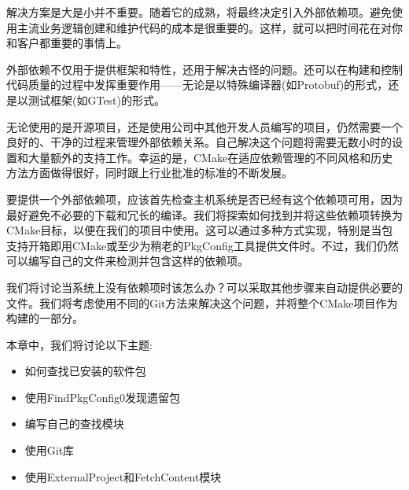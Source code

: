 解决方案是大是小并不重要。随着它的成熟，将最终决定引入外部依赖项。避免使用主流业务逻辑创建和维护代码的成本是很重要的。这样，就可以把时间花在对你和客户都重要的事情上。

外部依赖不仅用于提供框架和特性，还用于解决古怪的问题。还可以在构建和控制代码质量的过程中发挥重要作用——无论是以特殊编译器(如Protobuf)的形式，还是以测试框架(如GTest)的形式。

无论使用的是开源项目，还是使用公司中其他开发人员编写的项目，仍然需要一个良好的、干净的过程来管理外部依赖关系。自己解决这个问题将需要无数小时的设置和大量额外的支持工作。幸运的是，CMake在适应依赖管理的不同风格和历史方法方面做得很好，同时跟上行业批准的标准的不断发展。

要提供一个外部依赖项，应该首先检查主机系统是否已经有这个依赖项可用，因为最好避免不必要的下载和冗长的编译。我们将探索如何找到并将这些依赖项转换为CMake目标，以便在我们的项目中使用。这可以通过多种方式实现，特别是当包支持开箱即用CMake或至少为稍老的PkgConfig工具提供文件时。不过，我们仍然可以编写自己的文件来检测并包含这样的依赖项。

我们将讨论当系统上没有依赖项时该怎么办？可以采取其他步骤来自动提供必要的文件。我们将考虑使用不同的Git方法来解决这个问题，并将整个CMake项目作为构建的一部分。

本章中，我们将讨论以下主题:

\begin{itemize}
\item 
如何查找已安装的软件包

\item 
使用FindPkgConfig0发现遗留包

\item 
编写自己的查找模块

\item 
使用Git库

\item 
使用ExternalProject和FetchContent模块
\end{itemize}

